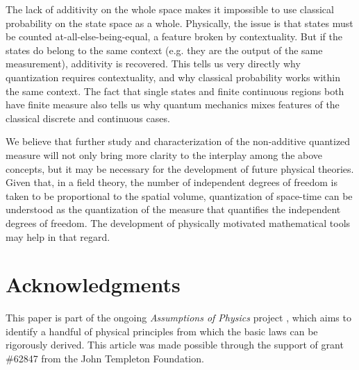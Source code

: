 \documentclass[10pt,twocolumn, nofootinbib]{revtex4-2}
\begin{document}
The lack of additivity on the whole space makes it impossible to use classical probability on the state space as a whole. Physically, the issue is that states must be counted at-all-else-being-equal, a feature broken by contextuality. But if the states do belong to the same context (e.g. they are the output of the same measurement), additivity is recovered. This tells us very directly why quantization requires contextuality, and why classical probability works within the same context. The fact that single states and finite continuous regions both have finite measure also tells us why quantum mechanics mixes features of the classical discrete and continuous cases.

We believe that further study and characterization of the non-additive quantized measure will not only bring more clarity to the interplay among the above concepts, but it may be necessary for the development of future physical theories. Given that, in a field theory, the number of independent degrees of freedom is taken to be proportional to the spatial volume, quantization of space-time can be understood as the quantization of the measure that quantifies the independent degrees of freedom. The development of physically motivated mathematical tools may help in that regard.

\section*{Acknowledgments}
This paper is part of the ongoing \textit{Assumptions of Physics} project \cite{aop-book}, which aims to identify a handful of physical principles from which the basic laws can be rigorously derived. This article was made possible through the support of grant \#62847 from the John Templeton Foundation.




\newcommand{\pj}[1] {\underbar{$#1$}}
\end{document}
